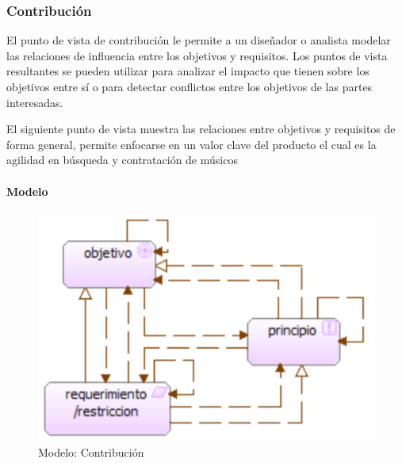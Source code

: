 \newpage

\subsubsection{Contribución}
El punto de vista de contribución le permite a un diseñador o analista modelar las relaciones de influencia entre los objetivos y requisitos. Los puntos de vista resultantes se pueden utilizar para analizar el impacto que tienen sobre los objetivos entre sí o para detectar conflictos entre los objetivos de las partes interesadas.
  \vspace{\baselineskip}

El siguiente punto de vista muestra las relaciones entre objetivos y requisitos de forma general, permite enfocarse en un valor clave del producto el cual es la agilidad en búsqueda y contratación de músicos

\paragraph{Modelo}
\begin{figure}[h!]
	\centering
	\includegraphics[width=0.6\linewidth]{Desarrollo/ArquitecturaEmpresarial/Motivacion/imgs/ContribucionMetamodelo.PNG}
	\caption{Modelo: Contribución}
\end{figure}
\newpage
